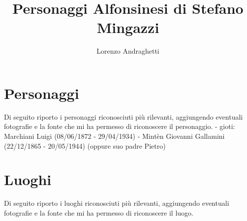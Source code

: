 \documentclass[10pt]{memoir} %
\title{Personaggi Alfonsinesi di Stefano Mingazzi} %
\author{Lorenzo Andraghetti} %
\begin{document}


\cleardoublepage

\cleardoublepage
\pagestyle{plain}\renewcommand{\chaptermark}[1]{\markboth{\chaptername\ \thechapter.\ #1}{}} 
\renewcommand{\sectionmark}[1]{\markright{\thesection.\ #1}}  






















































\chapter*{Personaggi}
\label{Personaggi}
Di seguito riporto i personaggi riconosciuti più rilevanti, aggiungendo eventuali fotografie e la fonte che mi ha permesso di riconoscere il personaggio.
- gioti: Marchiani Luigi (08/06/1872 - 29/04/1934)
- Mintèn Giovanni Gallamini (22/12/1865 - 20/05/1944) (oppure suo padre Pietro)
\renewcommand{\indexname}{Indice dei Personaggi}
\printindex[Personaggi]

\chapter*{Luoghi}
\label{Luoghi}
Di seguito riporto i luoghi riconosciuti più rilevanti, aggiungendo eventuali fotografie e la fonte che mi ha permesso di riconoscere il luogo.
\renewcommand{\indexname}{Indice dei Luoghi}
\printindex[Luoghi]


\end{document}
